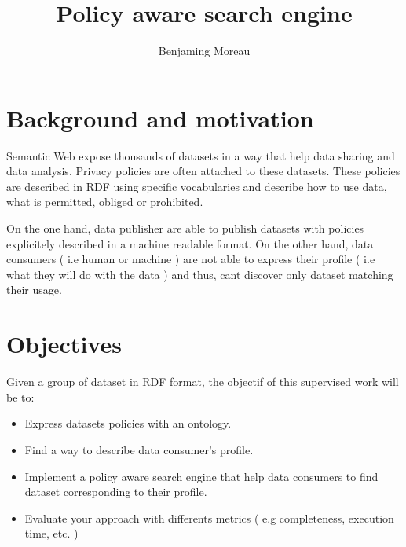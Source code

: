 \documentclass{llncs}
\begin{document}
%
\mainmatter              %
%
\title{Policy aware search engine}

%
\author{Benjaming Moreau}
%

\maketitle              %

%

\section*{Background and motivation}

Semantic Web expose thousands of datasets in a way that help data sharing and data analysis. Privacy policies are often attached to these datasets. These policies are described in RDF using specific vocabularies\cite{soto2015policies} and describe how to use data, what is permitted, obliged or prohibited. 

On the one hand, data publisher are able to publish datasets with policies explicitely described in a machine readable format.  On the other hand, data consumers ( i.e human or machine ) are not able to express their profile ( i.e what they will do with the data ) and thus, cant discover only dataset matching their usage. 

\section*{Objectives}
Given a group of dataset in RDF format, the objectif of this supervised work will be to:
\begin{itemize}
	\item Express datasets policies with an ontology.
	\item Find a way to describe data consumer's profile.
	\item Implement a policy aware search engine that help data consumers to find dataset corresponding to their profile.
	\item Evaluate your approach with differents metrics ( e.g completeness, execution time, etc. )
\end{itemize}
\end{document}
